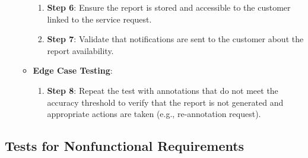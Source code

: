 \documentclass[12pt, titlepage]{article}
\begin{document}
\begin{enumerate}
\begin{itemize}
\begin{enumerate}
            \item \textbf{Step 6}: Ensure the report is stored and accessible to the customer linked to the service request.
            \item \textbf{Step 7}: Validate that notifications are sent to the customer about the report availability.
        \end{enumerate}
        \item \textbf{Edge Case Testing}:
        \begin{enumerate}
            \item \textbf{Step 8}: Repeat the test with annotations that do not meet the accuracy threshold to verify that the report is not generated and appropriate actions are taken (e.g., re-annotation request).
        \end{enumerate}
    \end{itemize}
\end{enumerate}

\subsection{Tests for Nonfunctional Requirements}






\end{document}
